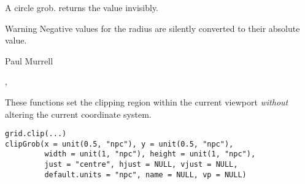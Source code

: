 %
\begin{Value}
A circle grob.   returns the value invisibly.
\end{Value}
%
\begin{Section}{Warning}
Negative values for the radius are silently converted to their
absolute value.

\end{Section}
%
\begin{Author}\relax
Paul Murrell
\end{Author}
%
\begin{SeeAlso}\relax
{},
\end{SeeAlso}
%
\begin{Description}\relax
These functions set the clipping region within the current viewport
\emph{without} altering the current coordinate system.
\end{Description}
%
\begin{Usage}
\begin{verbatim}
grid.clip(...)
clipGrob(x = unit(0.5, "npc"), y = unit(0.5, "npc"),
         width = unit(1, "npc"), height = unit(1, "npc"),
         just = "centre", hjust = NULL, vjust = NULL, 
         default.units = "npc", name = NULL, vp = NULL)
\end{verbatim}
\end{Usage}
%
